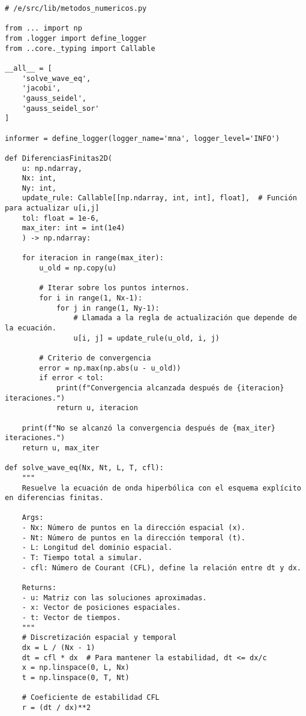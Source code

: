 \begin{verbatim}
# /e/src/lib/metodos_numericos.py

from ... import np
from .logger import define_logger
from ..core._typing import Callable

__all__ = [
    'solve_wave_eq',
    'jacobi',
    'gauss_seidel',
    'gauss_seidel_sor'
]

informer = define_logger(logger_name='mna', logger_level='INFO')

def DiferenciasFinitas2D(
    u: np.ndarray, 
    Nx: int, 
    Ny: int, 
    update_rule: Callable[[np.ndarray, int, int], float],  # Función para actualizar u[i,j]
    tol: float = 1e-6,
    max_iter: int = int(1e4)
    ) -> np.ndarray:
    
    for iteracion in range(max_iter):
        u_old = np.copy(u)
        
        # Iterar sobre los puntos internos.
        for i in range(1, Nx-1):
            for j in range(1, Ny-1):
                # Llamada a la regla de actualización que depende de la ecuación.
                u[i, j] = update_rule(u_old, i, j)
        
        # Criterio de convergencia
        error = np.max(np.abs(u - u_old))
        if error < tol: 
            print(f"Convergencia alcanzada después de {iteracion} iteraciones.")
            return u, iteracion
        
    print(f"No se alcanzó la convergencia después de {max_iter} iteraciones.")
    return u, max_iter

def solve_wave_eq(Nx, Nt, L, T, cfl):
    """
    Resuelve la ecuación de onda hiperbólica con el esquema explícito en diferencias finitas.
    
    Args:
    - Nx: Número de puntos en la dirección espacial (x).
    - Nt: Número de puntos en la dirección temporal (t).
    - L: Longitud del dominio espacial.
    - T: Tiempo total a simular.
    - cfl: Número de Courant (CFL), define la relación entre dt y dx.
    
    Returns:
    - u: Matriz con las soluciones aproximadas.
    - x: Vector de posiciones espaciales.
    - t: Vector de tiempos.
    """
    # Discretización espacial y temporal
    dx = L / (Nx - 1)
    dt = cfl * dx  # Para mantener la estabilidad, dt <= dx/c
    x = np.linspace(0, L, Nx)
    t = np.linspace(0, T, Nt)
    
    # Coeficiente de estabilidad CFL
    r = (dt / dx)**2
    

\end{verbatim}
